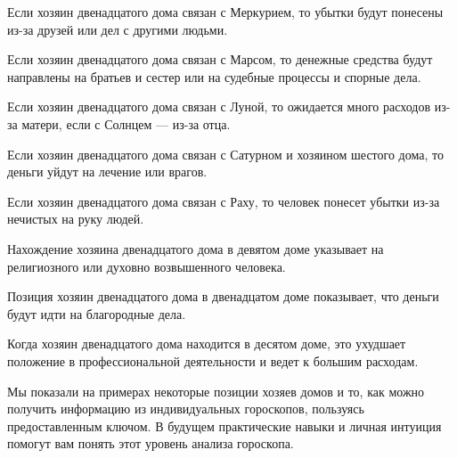 Если хозяин двенадцатого дома связан с Меркурием, то убытки будут понесены из-за друзей или дел с другими людьми.

Если хозяин двенадцатого дома связан с Марсом, то денежные средства будут направлены на братьев и сестер или на судебные процессы и спорные дела.

Если хозяин двенадцатого дома связан с Луной, то ожидается много расходов из-за матери, если с Солнцем --- из-за отца.

Если хозяин двенадцатого дома связан с Сатурном и хозяином шестого дома, то деньги уйдут на лечение или врагов.

Если хозяин двенадцатого дома связан с Раху, то человек понесет убытки из-за нечистых на руку людей.

Нахождение хозяина двенадцатого дома в девятом доме указывает на религиозного или духовно возвышенного человека.

Позиция хозяин двенадцатого дома в двенадцатом доме показывает, что деньги будут идти на благородные дела.

Когда хозяин двенадцатого дома находится в десятом доме, это ухудшает положение в профессиональной деятельности и ведет к большим расходам.

Мы показали на примерах некоторые позиции хозяев домов и то, как можно получить информацию из индивидуальных гороскопов, пользуясь предоставленным ключом. В будущем практические навыки и личная интуиция помогут вам понять этот уровень анализа гороскопа.
